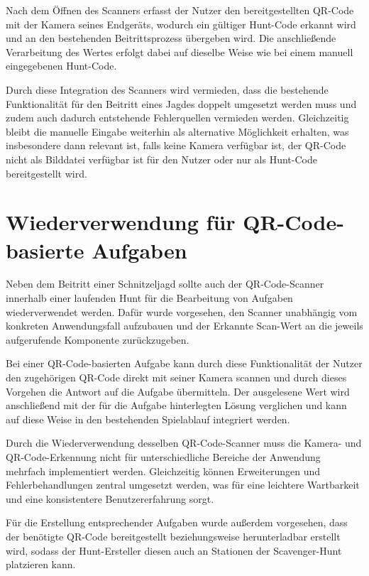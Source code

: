 ﻿\documentclass[oneside]{ausarbeitung}
\begin{document}
Nach dem Öffnen des Scanners erfasst der Nutzer den bereitgestellten QR-Code mit der Kamera seines Endgeräts, wodurch ein gültiger Hunt-Code erkannt 
wird und an den bestehenden Beitrittsprozess übergeben wird. Die anschließende Verarbeitung des Wertes erfolgt dabei auf dieselbe Weise wie bei einem 
manuell eingegebenen Hunt-Code.

Durch diese Integration des Scanners wird vermieden, dass die bestehende Funktionalität für den Beitritt eines Jagdes doppelt umgesetzt werden muss und
zudem auch dadurch entstehende Fehlerquellen vermieden werden. Gleichzeitig bleibt die manuelle Eingabe weiterhin als alternative Möglichkeit erhalten,
was insbesondere dann relevant ist, falls keine Kamera verfügbar ist, der QR-Code nicht als Bilddatei verfügbar ist für den Nutzer oder 
nur als Hunt-Code bereitgestellt wird. 


\section{Wiederverwendung für QR-Code-basierte Aufgaben}
\label{sec:qr-aufgaben}

Neben dem Beitritt einer Schnitzeljagd sollte auch der QR-Code-Scanner innerhalb einer laufenden Hunt für die Bearbeitung von Aufgaben wiederverwendet
werden. Dafür wurde vorgesehen, den Scanner unabhängig vom konkreten Anwendungsfall aufzubauen und der Erkannte Scan-Wert an die jeweils
aufgerufende Komponente zurückzugeben.

Bei einer QR-Code-basierten Aufgabe kann durch diese Funktionalität der Nutzer den zugehörigen QR-Code direkt mit seiner Kamera scannen und durch
dieses Vorgehen die Antwort auf die Aufgabe übermitteln. Der ausgelesene Wert wird anschließend mit der für die Aufgabe hinterlegten Lösung verglichen
und kann auf diese Weise in den bestehenden Spielablauf integriert werden.

Durch die Wiederverwendung desselben QR-Code-Scanner muss die Kamera- und QR-Code-Erkennung nicht für unterschiedliche Bereiche der Anwendung mehrfach
implementiert werden. Gleichzeitig können Erweiterungen und Fehlerbehandlungen zentral umgesetzt werden, was für eine leichtere Wartbarkeit und
eine konsistentere Benutzererfahrung sorgt.

Für die Erstellung entsprechender Aufgaben wurde außerdem vorgesehen, dass der benötigte QR-Code bereitgestellt beziehungsweise herunterladbar
erstellt wird, sodass der Hunt-Ersteller diesen auch an Stationen der Scavenger-Hunt platzieren kann.
\end{document}
